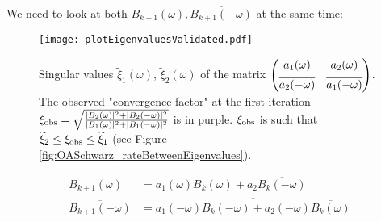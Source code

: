 We need to look at both
$B_{k+1}(\omega), \overline{B_{k+1}(-{\omega})}$
at the same time:
\begin{figure}
    \centering
    \texttt{[image: plotEigenvaluesValidated.pdf]}
	\caption{Singular values $\widetilde{\xi}_1(\omega)$,
	$\widetilde{\xi}_2(\omega)$ of the matrix $\begin{pmatrix}
	a_1(\omega) & a_2(\omega) \vspace{0.15cm}\\
	\overline{a_2(-\omega)} & \overline{a_1(-\omega)} \\
	\end{pmatrix}$.
	The observed "convergence factor" at the first
	iteration ${\xi}_{\rm obs} = \sqrt{\frac{|B_2(\omega)|^2 +
	|B_2(-\omega)|^2}{|B_{1}(\omega)|^2
	+ |B_{1}(-\omega)|^2}}$
	is in purple. ${\xi}_{\rm obs}$ is such that
	$\widetilde{\xi}_2 \leq {\xi}_{\rm obs}
	\leq\widetilde{\xi}_1$ (see Figure
	\ref{fig:OASchwarz_rateBetweenEigenvalues}).
	}
    \label{fig:OASchwarz_singularValues}
\end{figure}
\begin{equation}
	\begin{aligned}
		B_{k+1}(\omega) &= a_1(\omega) B_{k}(\omega) + a_2
		\overline{B_{k}(-{\omega})}\\
		\overline{B_{k+1}(-{\omega})} &=
		\overline{a_1(-{\omega})
			B_{k}(-{\omega})
		+ {a_2(-{\omega})} \overline{B_{k}(\omega)}}
	\end{aligned}
\end{equation}
